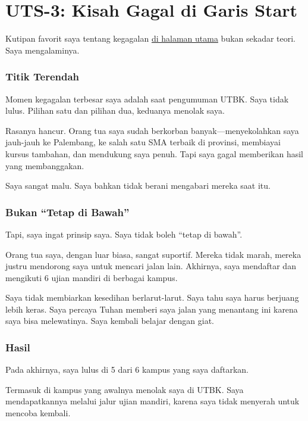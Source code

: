 \documentclass[
  letterpaper,
  DIV=11,
  numbers=noendperiod]{scrreprt}
\begin{document}

\chapter{UTS-3: Kisah Gagal di Garis
Start}\label{uts-3-kisah-gagal-di-garis-start}

Kutipan favorit saya tentang kegagalan
\hyperref[uts-3-kisah-gagal-di-garis-start]{di halaman utama} bukan
sekadar teori. Saya mengalaminya.

\subsection{Titik Terendah}\label{titik-terendah}

Momen kegagalan terbesar saya adalah saat pengumuman UTBK. Saya tidak
lulus. Pilihan satu dan pilihan dua, keduanya menolak saya.

Rasanya hancur. Orang tua saya sudah berkorban banyak---menyekolahkan
saya jauh-jauh ke Palembang, ke salah satu SMA terbaik di provinsi,
membiayai kursus tambahan, dan mendukung saya penuh. Tapi saya gagal
memberikan hasil yang membanggakan.

Saya sangat malu. Saya bahkan tidak berani mengabari mereka saat itu.

\subsection{Bukan ``Tetap di Bawah''}\label{bukan-tetap-di-bawah}

Tapi, saya ingat prinsip saya. Saya tidak boleh ``tetap di bawah''.

Orang tua saya, dengan luar biasa, sangat suportif. Mereka tidak marah,
mereka justru mendorong saya untuk mencari jalan lain. Akhirnya, saya
mendaftar dan mengikuti 6 ujian mandiri di berbagai kampus.

Saya tidak membiarkan kesedihan berlarut-larut. Saya tahu saya harus
berjuang lebih keras. Saya percaya Tuhan memberi saya jalan yang
menantang ini karena saya bisa melewatinya. Saya kembali belajar dengan
giat.

\subsection{Hasil}\label{hasil}

Pada akhirnya, saya lulus di 5 dari 6 kampus yang saya daftarkan.

Termasuk di kampus yang awalnya menolak saya di UTBK. Saya
mendapatkannya melalui jalur ujian mandiri, karena saya tidak menyerah
untuk mencoba kembali.
\end{document}
